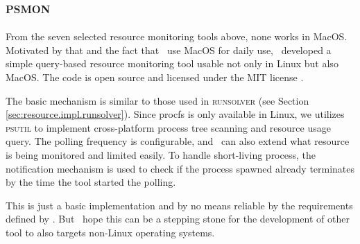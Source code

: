 \subsection{\textsc{psmon}}
\label{sec:res.psmon}

From the seven selected resource monitoring tools above, none works in MacOS.
Motivated by that and the fact that \first~use MacOS for daily use, \first~developed a simple query-based resource monitoring tool usable not only in Linux but also MacOS.
The code is open source and licensed under the MIT license \citep{kautsarPsmonMonitorsLimits2019}.

The basic mechanism is similar to those used in \textsc{runsolver} (see Section \ref{sec:resource.impl.runsolver}).
Since procfs is only available in Linux, we utilizes \textsc{psutil} to implement cross-platform process tree scanning and resource usage query.
The polling frequency is configurable, and \first~can also extend what resource is being monitored and limited easily.
To handle short-living process, the notification mechanism  is used to check if the process spawned already terminates by the time the tool started the polling.

This is just a basic implementation and by no means reliable by the requirements defined by \citet{beyerReliableBenchmarkingRequirements2019}.
But \first~hope this can be a stepping stone for the development of other tool to also targets non-Linux operating systems.

